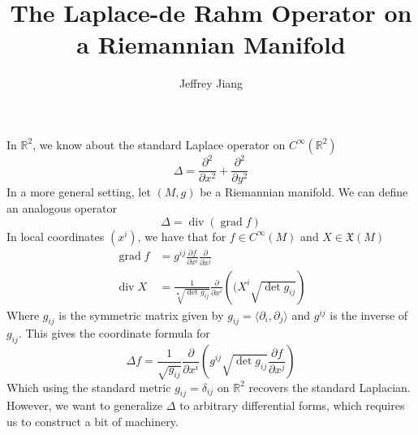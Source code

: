 \documentclass[psamsfonts]{amsart}
\theoremstyle{definition}
\theoremstyle{remark}
\newcommand{\R}{\mathbb{R}}
\DeclareMathOperator{\dv}{div}
\DeclareMathOperator{\grad}{grad}
\begin{document}
\author{Jeffrey Jiang}
\title{The Laplace-de Rahm Operator on a Riemannian Manifold}
\maketitle
%
\setcounter{section}{1}
%
In $\R^2$, we know about the standard Laplace operator on $C^\infty(\R^2)$
$$\Delta = \frac{\partial^2}{\partial x^2} + \frac{\partial^2 }{\partial y^2}$$
In a more general setting, let $(M,g)$ be a Riemannian manifold. We can define an analogous operator
$$\Delta = \dv(\grad f) $$
In local coordinates $(x^i)$, we have that  for $f \in C^\infty(M)$  and $X \in \mathfrak{X}(M)$
\begin{align*}
\grad f &= g^{ij}\frac{\partial f}{\partial x^i}\frac{\partial }{\partial x^j} \\[6pt]
\dv X &= \frac{1}{\sqrt[•]{\det  g_{ij}}} \frac{\partial}{\partial x^i}\left((X^i \sqrt{\det g_{ij}}\right)
\end{align*}
Where $g_{ij}$ is the symmetric matrix given by $g_{ij} = \langle \partial_i ,\partial_j\rangle$ and $g^{ij}$ is the inverse of $g_{ij}$. This gives the coordinate formula for 
$$\Delta f = \frac{1}{\sqrt{g_{ij}}} \frac{\partial}{\partial x^i}\left( g^{ij} \sqrt{\det g_{ij}}\frac{\partial f}{\partial x^j} \right)$$
Which using the standard metric $g_{ij} = \delta_{ij}$ on $\R^2$ recovers the standard Laplacian. However, we want to generalize $\Delta$ to arbitrary differential forms, which requires us to construct a  bit of machinery.
\end{document}
